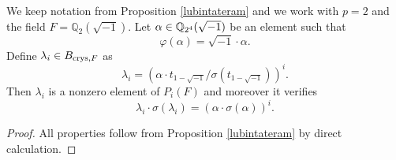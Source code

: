 \documentclass[11pt]{amsart}
\begin{document}
\begin{corollary}\label{brinonwild}
We keep notation from Proposition  \ref{lubintateram} and we work  with $p=2$ and the field  $F=\mathbb{Q}_2(\sqrt{-1})$.  Let $\alpha \in \mathbb{Q}_{2^4}(\sqrt{-1})$ be an element  such that
\[\varphi(\alpha) =  \sqrt{-1} \cdot \alpha.\]
Define $\lambda_i \in B_{\textnormal{crys},F}$ as
\[\lambda_i = (\alpha \cdot t_{1-\sqrt{-1}} /\sigma(t_{1-\sqrt{-1}}))^i .\]
Then $\lambda_i$ is a nonzero element of  $P_{i}(F) $ and  moreover it verifies
\[\lambda_i \cdot\sigma(\lambda_i) = (\alpha  \cdot \sigma(\alpha) )^i.\] 
\end{corollary}
\begin{proof}
All properties follow from Proposition \ref{lubintateram}  by direct calculation.
\end{proof}
\end{document}
